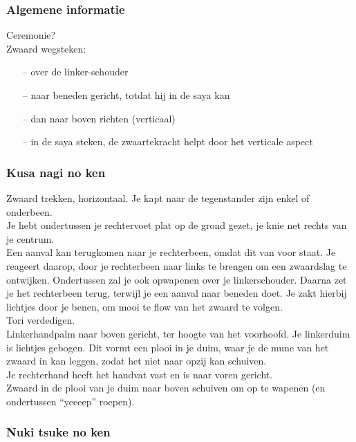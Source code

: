 \subsubsection{Algemene informatie}

Ceremonie?\\

Zwaard wegsteken:
\begin{itemize}
\item[--] over de linker-schouder
\item[--] naar beneden gericht, totdat hij in de saya kan
\item[--] dan naar boven richten (verticaal)
\item[--] in de saya steken, de zwaartekracht helpt door het verticale aspect
\end{itemize}


\subsubsection{Kusa nagi no ken}

\suwaristart
Zwaard trekken, horizontaal. Je kapt naar de tegenstander zijn enkel of onderbeen.\\
Je hebt ondertussen je rechtervoet plat op de grond gezet, je knie net rechts van je centrum.\\
Een aanval kan terugkomen naar je rechterbeen, omdat dit van voor staat. Je reageert daarop, door je rechterbeen naar links te brengen om een zwaardslag te ontwijken. Ondertussen zal je ook opwapenen over je linkerschouder. Daarna zet je het rechterbeen terug, terwijl je een aanval naar beneden doet. Je zakt hierbij lichtjes door je benen, om mooi te flow van het zwaard te volgen.\\
Tori verdedigen.\\
Linkerhandpalm naar boven gericht, ter hoogte van het voorhoofd. Je linkerduim is lichtjes gebogen. Dit vormt een plooi in je duim, waar je de mune van het zwaard in kan leggen, zodat het niet naar opzij kan schuiven.\\
Je rechterhand heeft het handvat vast en is naar voren gericht.\\
Zwaard in de plooi van je duim naar boven schuiven om op te wapenen (en ondertussen ``yeeeep'' roepen).\\
\suwaristop

\subsubsection{Nuki tsuke no ken}

